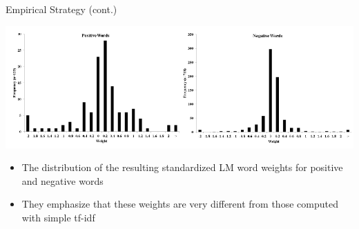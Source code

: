 \documentclass[english]{beamer}
\begin{document}
\begin{frame}{Empirical Strategy (cont.)}
\begin{center}
\includegraphics[scale=0.45]{Images/jegadeesh2013-1.png}
\vspace{7pt}
\begin{itemize}
\setlength{\itemsep}{0.5em}
\item The distribution of the resulting standardized LM word weights for positive and negative words
\item They emphasize that these weights are very different from those computed with simple tf-idf
\end{itemize}
\end{center}
\end{frame}
\end{document}
